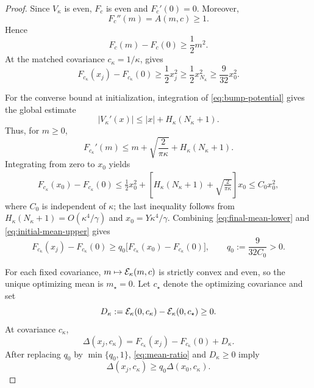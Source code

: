 \begin{proof}
Since $V_\kappa$ is even, $F_c$ is even and $F_c'(0)=0$.  Moreover,
\[
    F_c''(m)=A(m,c)\geq1.
\]
Hence
\begin{equation}
\label{eq:Fc-lower}
    F_c(m)-F_c(0)\geq\frac12m^2.
\end{equation}
At the matched covariance $c_\kappa=1/\kappa$,  gives
\begin{equation}
\label{eq:final-mean-lower}
    F_{c_\kappa}(x_j)-F_{c_\kappa}(0)
    \geq\frac12x_j^2
    \geq\frac12x_{N_\kappa}^2
    \geq\frac{9}{32}x_0^2.
\end{equation}

For the converse bound at initialization, integration of
\eqref{eq:bump-potential} gives the global estimate
\begin{equation}
\label{eq:Vprime-global}
    |V_\kappa'(x)|
    \leq |x|+H_\kappa(N_\kappa+1).
\end{equation}
Thus, for $m\geq0$,
\[
    F_{c_\kappa}'(m)
    \leq
    m+\sqrt{\frac{2}{\pi\kappa}}+H_\kappa(N_\kappa+1).
\]
Integrating from zero to $x_0$ yields
\begin{align}
\label{eq:initial-mean-upper}
    F_{c_\kappa}(x_0)-F_{c_\kappa}(0)
    \leq
    \frac12x_0^2
    +\left[
        H_\kappa(N_\kappa+1)
        +\sqrt{\frac{2}{\pi\kappa}}
    \right]x_0
    \leq C_0x_0^2,
\end{align}
where $C_0$ is independent of $\kappa$; the last inequality follows from
$H_\kappa(N_\kappa+1)=O(\kappa^4/\gamma)$ and
$x_0=Y\kappa^4/\gamma$.
Combining \eqref{eq:final-mean-lower} and \eqref{eq:initial-mean-upper} gives
\begin{equation}
\label{eq:mean-ratio}
    F_{c_\kappa}(x_j)-F_{c_\kappa}(0)
    \geq q_0
    \bigl[F_{c_\kappa}(x_0)-F_{c_\kappa}(0)\bigr],
    \qquad
    q_0:=\frac{9}{32C_0}>0.
\end{equation}

For each fixed covariance, $m\mapsto\mathcal{E}_\kappa(m,c)$ is strictly convex and even, so the
unique optimizing mean is $m_\star=0$.  Let $c_\star$ denote the optimizing covariance and set
\[
    D_\kappa
    :=\mathcal{E}_\kappa(0,c_\kappa)-\mathcal{E}_\kappa(0,c_\star)
    \geq0.
\]
At covariance $c_\kappa$,
\[
    \Delta(x_j,c_\kappa)
    =F_{c_\kappa}(x_j)-F_{c_\kappa}(0)+D_\kappa.
\]
After replacing $q_0$ by $\min\{q_0,1\}$, \eqref{eq:mean-ratio} and $D_\kappa\geq0$ imply
\begin{equation}
\label{eq:ideal-gap-ratio}
    \Delta(x_j,c_\kappa)\geq q_0\Delta(x_0,c_\kappa).
\end{equation}


\end{proof}
